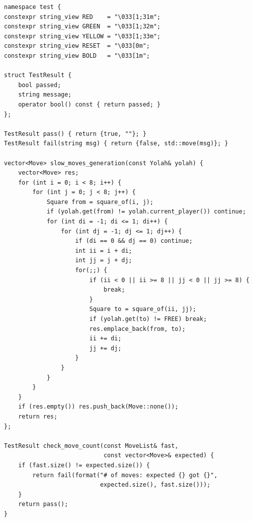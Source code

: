 \documentclass[12pt,a4paper,twoside,openright]{book}
\begin{document}
\begin{mdframed}[skipabove=\baselineskip,topline=false,rightline=false,bottomline=false,leftline=false,linewidth=1pt,linecolor=gray!40,innerleftmargin=8pt]
\begin{verbatim}
namespace test {
constexpr string_view RED    = "\033[1;31m";
constexpr string_view GREEN  = "\033[1;32m";
constexpr string_view YELLOW = "\033[1;33m";
constexpr string_view RESET  = "\033[0m";
constexpr string_view BOLD   = "\033[1m";

struct TestResult {
    bool passed;
    string message;
    operator bool() const { return passed; }
};

TestResult pass() { return {true, ""}; }
TestResult fail(string msg) { return {false, std::move(msg)}; }

vector<Move> slow_moves_generation(const Yolah& yolah) {
    vector<Move> res;
    for (int i = 0; i < 8; i++) {
        for (int j = 0; j < 8; j++) {
            Square from = square_of(i, j);
            if (yolah.get(from) != yolah.current_player()) continue;
            for (int di = -1; di <= 1; di++) {
                for (int dj = -1; dj <= 1; dj++) {
                    if (di == 0 && dj == 0) continue;
                    int ii = i + di;
                    int jj = j + dj;
                    for(;;) {
                        if (ii < 0 || ii >= 8 || jj < 0 || jj >= 8) {
                            break;
                        }
                        Square to = square_of(ii, jj);                                
                        if (yolah.get(to) != FREE) break;                                
                        res.emplace_back(from, to);
                        ii += di;
                        jj += dj;
                    }
                }
            }
        }
    }
    if (res.empty()) res.push_back(Move::none());
    return res;
};

TestResult check_move_count(const MoveList& fast, 
                            const vector<Move>& expected) {
    if (fast.size() != expected.size()) {
        return fail(format("# of moves: expected {} got {}", 
                           expected.size(), fast.size()));
    }
    return pass();
}


\end{verbatim}
\end{mdframed}
\end{document}
